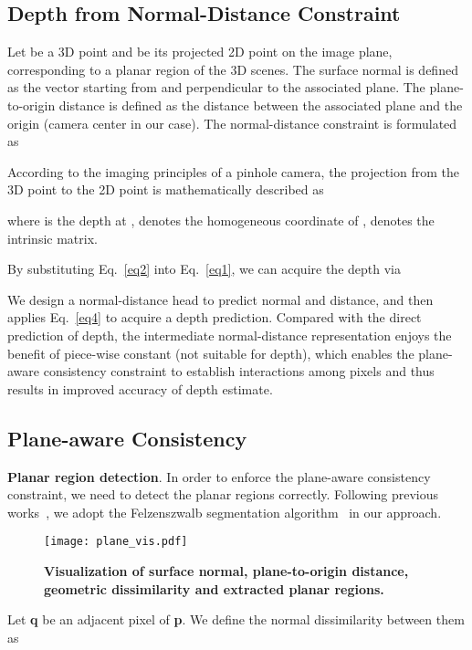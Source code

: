 \documentclass[10pt,twocolumn,letterpaper]{article}
\begin{document}
\subsection{Depth from Normal-Distance Constraint}
Let  be a 3D point and  be its projected 2D point on the image plane, corresponding to a planar region of the 3D scenes. The surface normal  is defined as the vector starting from  and perpendicular to the associated plane. The plane-to-origin distance  is defined as the distance between the associated plane and the origin (camera center in our case). The normal-distance constraint is formulated  as



According to the imaging principles of a pinhole camera, the projection from the 3D point  to the 2D point  is mathematically described as 
 
where  is the depth at ,  denotes the homogeneous coordinate of ,  denotes the intrinsic matrix.

By substituting Eq.~\ref{eq2} into Eq.~\ref{eq1}, we can acquire the depth via 


We design a normal-distance head to predict normal and distance, and then applies Eq.~\ref{eq4} to acquire a depth prediction. Compared with the direct prediction of depth, the intermediate normal-distance representation enjoys the benefit of piece-wise constant (not suitable for depth), which enables the plane-aware consistency constraint to establish interactions among pixels and thus results in improved accuracy of depth estimate.

\subsection{Plane-aware Consistency}
\textbf{Planar region detection}. In order to enforce the plane-aware consistency constraint, we need to detect the planar regions correctly. Following previous works~\cite{concha2014using,concha2015dpptam,yu2020p,li2021structdepth}, we adopt the Felzenszwalb segmentation algorithm~\cite{felzenszwalb2004efficient} in our approach. 

\begin{figure}[!htb]
\centering
	\texttt{[image: plane\_vis.pdf]}\caption{\textbf{Visualization of surface normal, plane-to-origin distance, geometric dissimilarity and extracted planar regions.}  }
	\label{Fig4}
\end{figure}

Let \textbf{q} be an adjacent pixel of \textbf{p}. We define the normal dissimilarity between them as
\end{document}
